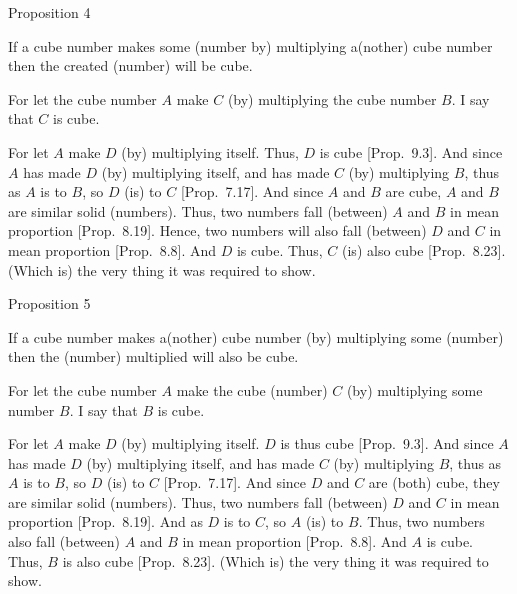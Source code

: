 
\begin{center}
{\large Proposition 4}
\end{center}

If a cube number makes some (number by) multiplying a(nother) cube number then the created (number) will be  cube.

\epsfysize=1.2in
\centerline{}

For let the cube number $A$ make $C$ (by) multiplying the cube number $B$. I say that $C$ is cube.

For let $A$ make $D$ (by) multiplying itself.  Thus, $D$ is  cube 
[Prop.~9.3]. And since $A$ has made
$D$ (by) multiplying itself, and has made $C$ (by) multiplying $B$, 
thus as $A$ is to $B$, so $D$ (is) to $C$ [Prop.~7.17].  And since $A$ and $B$ are cube, $A$ and $B$ are similar solid (numbers). Thus, two numbers fall
(between) $A$ and $B$ in mean proportion [Prop.~8.19]. Hence, two numbers will
also fall (between) $D$ and $C$ in mean proportion [Prop.~8.8]. And $D$ is  cube. Thus,
$C$ (is) also cube  [Prop.~8.23]. 
(Which is) the very thing it was required to show.


\begin{center}
{\large Proposition 5}
\end{center}

If a cube number makes a(nother) cube number
(by) multiplying some (number) then the (number) multiplied will also be 
cube.

\epsfysize=1.2in
\centerline{}

For let the cube number $A$ make the cube (number) $C$ (by) multiplying
some number $B$. I say that $B$ is cube.

For let $A$ make $D$ (by) multiplying itself. $D$ is thus  cube [Prop.~9.3]. And since $A$ has made $D$ (by)
multiplying itself, and has made $C$ (by) multiplying $B$, thus as $A$ is to
$B$, so $D$ (is) to $C$ [Prop.~7.17]. And since
$D$ and $C$ are (both) cube, they are similar solid (numbers). Thus,
two numbers fall (between) $D$ and $C$ in mean proportion [Prop.~8.19]. And as $D$  is to $C$, so $A$ (is) to $B$.  Thus, two numbers also fall (between) $A$ and $B$ in mean proportion
[Prop.~8.8]. And $A$ is  cube. Thus,
 $B$ is also  cube  [Prop.~8.23]. (Which is) the very thing it was required to show.

